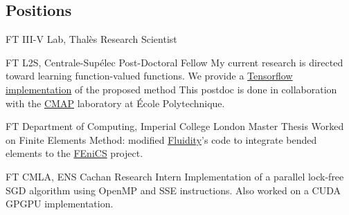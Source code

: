 \documentclass[10pt]{article} %
\begin{document}
\begin{paracol}{2}
\section{Positions}
%
%
%
%
%
{FT} %
{III-V Lab, Thal\`es} %
{Research Scientist} %
{}\par %
{FT} %
{L2S, Centrale-Sup\'elec} %
{Post-Doctoral Fellow} %
{My current research is directed toward learning function-valued functions. We
provide a  \href{https://bitbucket.org/RomainBrault/itl/}{Tensorflow
implementation} of the proposed method This postdoc is done in collaboration
with the \href{https://portail.polytechnique.edu/cmap/fr}{CMAP} laboratory at
\'Ecole Polytechnique.  }\par %
{FT}
{Department of Computing, Imperial College London}
{Master Thesis}
{Worked on Finite Elements Method: modified
\href{http://fluidityproject.github.io/publications/}{Fluidity}'s code to
integrate bended elements to the \href{https://fenicsproject.org/}{FEniCS}
project.}\par
{}
{FT}
{CMLA, ENS Cachan}
{Research Intern}
{Implementation of a parallel lock-free SGD algorithm using OpenMP and SSE
instructions.  Also worked on a CUDA GPGPU implementation.}\par
%
%

\end{paracol}
\end{document}
